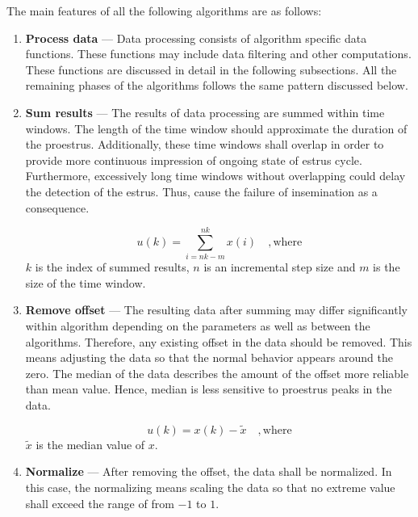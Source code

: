 \documentclass[english,12pt,a4paper,pdftex,elec,utf8]{aaltothesis}
\begin{document}
The main features of all the following algorithms are as follows:
\begin{enumerate}

\item \textbf{Process data} --- Data processing consists of algorithm specific data functions. These functions may include data filtering and other computations. These functions are discussed in detail in the following subsections. All the remaining phases of the algorithms follows the same pattern discussed below. 

\item \textbf{Sum results} --- The results of data processing are summed within time windows. The length of the time window should approximate the duration of the proestrus. Additionally, these time windows shall overlap in order to provide more continuous impression of ongoing state of estrus cycle. Furthermore, excessively long time windows without overlapping could delay the detection of the estrus. Thus, cause the failure of insemination as a consequence. 

\begin{equation}
u(k) =\sum\limits^{nk}_{i = nk - m} x(i) \mathrm{\hspace{1em}, where}
\end{equation}
$k$ is the index of summed results, $n$ is an incremental step size and $m$ is the size of the time window.

\item \textbf{Remove offset} --- The resulting data after summing may differ significantly within algorithm depending on the parameters as well as between the algorithms. Therefore, any existing offset in the data should be removed. This means adjusting the data so that the normal behavior appears around the zero. The median of the data describes the amount of the offset more reliable than mean value. Hence, median is less sensitive to proestrus peaks in the data.  

\begin{equation}
u(k) = x(k) - \tilde{x} \mathrm{\hspace{1em}, where}
\end{equation}
$\tilde{x}$ is the median value of $x$.

\item \textbf{Normalize} --- After removing the offset, the data shall be normalized. In this case, the normalizing means scaling the data so that no extreme value shall exceed the range of from $-1$ to $1$.


\end{enumerate}
\end{document}
